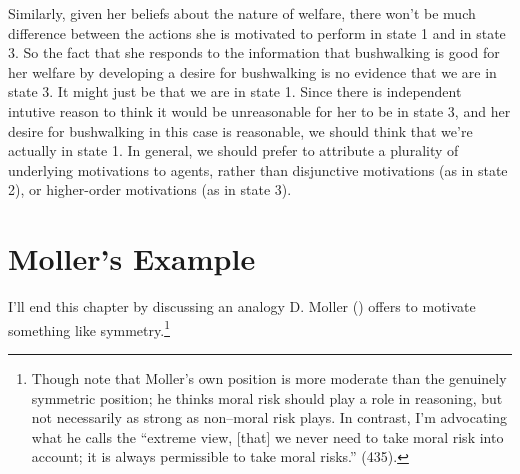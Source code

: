 \documentclass[
  10pt,
  letterpaper,
  twoside]{scrbook}
\begin{document}
Similarly, given her beliefs about the nature of welfare, there won't be
much difference between the actions she is motivated to perform in state
1 and in state 3. So the fact that she responds to the information that
bushwalking is good for her welfare by developing a desire for
bushwalking is no evidence that we are in state 3. It might just be that
we are in state 1. Since there is independent intutive reason to think
it would be unreasonable for her to be in state 3, and her desire for
bushwalking in this case is reasonable, we should think that we're
actually in state 1. In general, we should prefer to attribute a
plurality of underlying motivations to agents, rather than disjunctive
motivations (as in state 2), or higher-order motivations (as in state
3).

\section{Moller's Example}\label{mollersexample}

I'll end this chapter by discussing an analogy D. Moller
() offers to motivate something like
symmetry.\footnote{Though note that Moller's own position is more
  moderate than the genuinely symmetric position; he thinks moral risk
  should play a role in reasoning, but not necessarily as strong as
  non--moral risk plays. In contrast, I'm advocating what he calls the
  ``extreme view, {[}that{]} we never need to take moral risk into
  account; it is always permissible to take moral risks.'' (435).}
\end{document}
